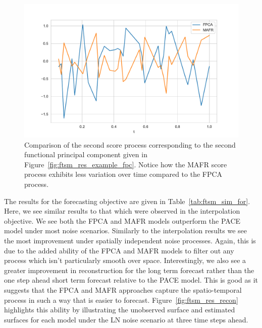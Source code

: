 \begin{figure}[htbp!] 
	\centering    
	\includegraphics[width=1.0\textwidth]{ftsm_res_zeta_example}
	\caption[Comparison of the second score process under FPCA and MAFR models.]{Comparison of the second score process corresponding to the second functional principal component given in Figure~\ref{fig:ftsm_res_example_fpc}. Notice how the MAFR score process exhibits less variation over time compared to the FPCA process.}
	\label{fig:ftsm_res_example_zeta}
\end{figure}

The results for the forecasting objective are given in Table~\ref{tab:ftsm_sim_for}.
Here, we see similar results to that which were observed in the interpolation objective.
We see both the FPCA and MAFR models outperform the PACE model under most noise scenarios.
Similarly to the interpolation results we see the most improvement under spatially independent noise processes.
Again, this is due to the added ability of the FPCA and MAFR models to filter out any process which isn't particularly smooth over space. 
Interestingly, we also see a greater improvement in reconstruction for the long term forecast rather than the one step ahead short term forecast relative to the PACE model.
This is good as it suggests that the FPCA and MAFR approaches capture the spatio-temporal process in such a way that is easier to forecast. 
Figure~\ref{fig:ftsm_res_recon} highlights this ability by illustrating the unobserved surface and estimated surfaces for each model under the LN noise scenario at three time steps ahead.

